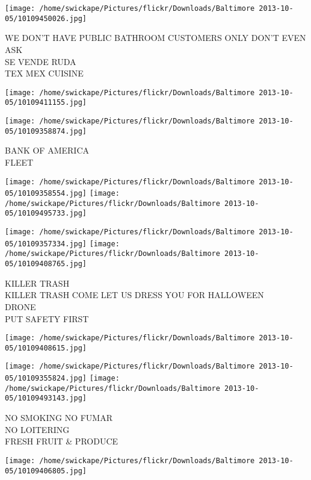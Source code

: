 \documentclass[10pt,letterpaper]{article}
\begin{document}
\texttt{[image: /home/swickape/Pictures/flickr/Downloads/Baltimore 2013-10-05/10109450026.jpg]}

WE DON'T HAVE PUBLIC BATHROOM CUSTOMERS ONLY DON'T EVEN ASK\\
SE VENDE RUDA\\
TEX MEX CUISINE\\
\pagebreak

\texttt{[image: /home/swickape/Pictures/flickr/Downloads/Baltimore 2013-10-05/10109411155.jpg]}

\vspace{0.25in}
\texttt{[image: /home/swickape/Pictures/flickr/Downloads/Baltimore 2013-10-05/10109358874.jpg]}

BANK OF AMERICA\\
FLEET\\
\pagebreak

\texttt{[image: /home/swickape/Pictures/flickr/Downloads/Baltimore 2013-10-05/10109358554.jpg]}
\texttt{[image: /home/swickape/Pictures/flickr/Downloads/Baltimore 2013-10-05/10109495733.jpg]}

\texttt{[image: /home/swickape/Pictures/flickr/Downloads/Baltimore 2013-10-05/10109357334.jpg]}
\texttt{[image: /home/swickape/Pictures/flickr/Downloads/Baltimore 2013-10-05/10109408765.jpg]}

KILLER TRASH\\
KILLER TRASH COME LET US DRESS YOU FOR HALLOWEEN\\
DRONE\\
PUT SAFETY FIRST\\
\pagebreak

\texttt{[image: /home/swickape/Pictures/flickr/Downloads/Baltimore 2013-10-05/10109408615.jpg]}

\vspace{0.25in}
\texttt{[image: /home/swickape/Pictures/flickr/Downloads/Baltimore 2013-10-05/10109355824.jpg]}
\texttt{[image: /home/swickape/Pictures/flickr/Downloads/Baltimore 2013-10-05/10109493143.jpg]}

NO SMOKING NO FUMAR\\
NO LOITERING\\
FRESH FRUIT \& PRODUCE\\
\pagebreak

\texttt{[image: /home/swickape/Pictures/flickr/Downloads/Baltimore 2013-10-05/10109406805.jpg]}
\end{document}
